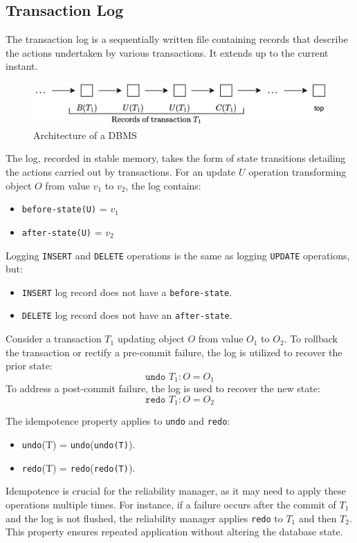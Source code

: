 \subsection{Transaction Log}
The transaction log is a sequentially written file containing records that describe the actions undertaken by various transactions. 
It extends up to the current instant.
\begin{figure}[H]
    \centering
    \includegraphics[width=0.5\linewidth]{images/tl.png}
    \caption{Architecture of a DBMS}
\end{figure}
The log, recorded in stable memory, takes the form of state transitions detailing the actions carried out by transactions.
For an update $U$ operation transforming object $O$ from value $v_1$ to $v_2$, the log contains:
\begin{itemize}
    \item \texttt{before-state(U)} = $v_1$
    \item \texttt{after-state(U)} = $v_2$
\end{itemize}
Logging \texttt{INSERT} and \texttt{DELETE} operations is the same as logging \texttt{UPDATE} operations, but:
\begin{itemize}
    \item \texttt{INSERT} log record does not have a \texttt{before-state}.
    \item \texttt{DELETE} log record does not have an \texttt{after-state}.
\end{itemize}
\begin{example}
    Consider a transaction $T_1$ updating object $O$ from value $O_1$ to $O_2$.
    To rollback the transaction or rectify a pre-commit failure, the log is utilized to recover the prior state:
    \[\texttt{undo }T_1:O=O_1\]
    To address a post-commit failure, the log is used to recover the new state:
    \[\texttt{redo }T_1:O=O_2\]
\end{example}
The idempotence property applies to \texttt{undo} and \texttt{redo}: 
\begin{itemize}
    \item \texttt{undo}(T) = \texttt{undo}(\texttt{undo(T)}).
    \item \texttt{redo}(T) = \texttt{redo}(\texttt{redo(T)}).
\end{itemize}
Idempotence is crucial for the reliability manager, as it may need to apply these operations multiple times. 
For instance, if a failure occurs after the commit of $T_1$ and the log is not flushed, the reliability manager applies \texttt{redo} to $T_1$ and then $T_2$.
This property ensures repeated application without altering the database state.

